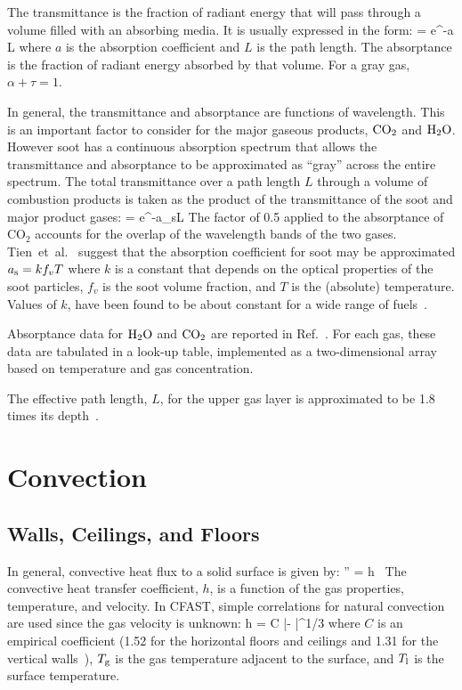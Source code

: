The transmittance is the fraction of radiant energy that will pass through a volume filled with an absorbing media. It is usually expressed in the form:
\be
   \tau = {\rm e}^{-a L}
\ee
where $a$ is the absorption coefficient and $L$ is the path length. The absorptance is the fraction of radiant energy absorbed by that volume. For a gray gas, $\alpha + \tau = 1$.

In general, the transmittance and absorptance are functions of wavelength. This is an important factor to consider for the major gaseous products, $\textnormal{CO}_2$  and $\textnormal{H}_2 \textnormal{O}$. However soot has a continuous absorption spectrum that allows the transmittance and absorptance to be approximated as ``gray'' \cite{SiegelandHowell:1981} across the entire spectrum. The total transmittance over a path length $L$ through a volume of combustion products is taken as the product of the transmittance of the soot and major product gases:
\be 
   \tau = e^{-a_{\rm s}L}  
\ee
The factor of 0.5 applied to the absorptance of CO$_2$ accounts for the overlap of the wavelength bands of the two gases. Tien~et~al.~\cite{Tien:2002} suggest that the absorption coefficient for soot may be approximated $a_{\rm s} = k f_v T$ where $k$ is a constant that depends on the optical properties of the soot particles, $f_v$ is the soot volume fraction, and $T$ is the (absolute) temperature. Values of $k$, have been found to be about constant for a wide range of fuels~\cite{Tien:1978}.

Absorptance data for $\textnormal{H}_2 \textnormal{O}$ and $\textnormal{CO}_2$ are reported in Ref.~\cite{Edwards:1985}. For each gas, these data are tabulated in a look-up table, implemented as a two-dimensional array based on temperature and gas concentration.  

The effective path length, $L$, for the upper gas layer is approximated to be 1.8 times its depth~\cite{Tien:2002}.




\section{Convection}

\subsection{Walls, Ceilings, and Floors}

In general, convective heat flux to a solid surface is given by:
\be
   \dqc'' = h \, \brackets{\Tg - \Ts}  \label{convective_heat_flux}
\ee
The convective heat transfer coefficient, $h$, is a function of the gas properties, temperature, and velocity. In CFAST, simple correlations for natural convection are used since the gas velocity is unknown:
\be
   h = C {|\Tg - \Ts|}^{1/3}
\ee
where $C$ is an empirical coefficient (1.52 for the horizontal floors and ceilings and 1.31 for the vertical walls~\cite{Holman:1990}), $T_{\rm g}$ is the gas temperature adjacent to the surface, and $T_{\rm l}$ is the surface temperature.

